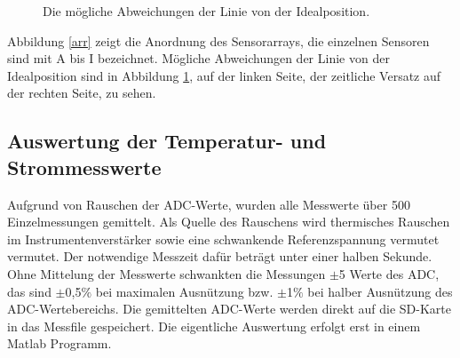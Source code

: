 \documentclass[a4paper,bibtotoc,oneside]{scrbook}
\begin{document}
\begin{figure}
\centering
\caption{Die mögliche Abweichungen der Linie von der Idealposition.}
\label{abw}
\end{figure} 

\noindent Abbildung \ref{arr} zeigt die Anordnung des Sensorarrays, die einzelnen Sensoren sind mit A bis I bezeichnet. Mögliche Abweichungen der Linie von der Idealposition sind in Abbildung \ref{abw}, auf der linken Seite, der zeitliche Versatz auf der rechten Seite, zu sehen.

\subsection{Auswertung der Temperatur- und Strommesswerte}\thispagestyle{empty}
Aufgrund von Rauschen der ADC-Werte, wurden alle Messwerte über 500 Einzelmessungen gemittelt. Als Quelle des Rauschens wird thermisches Rauschen im Instrumentenverstärker sowie eine schwankende Referenzspannung vermutet vermutet. Der notwendige Messzeit dafür beträgt unter einer halben Sekunde. Ohne Mittelung der Messwerte schwankten die Messungen $\pm$5 Werte des ADC, das sind $\pm$0,5$\%$ bei maximalen Ausnützung bzw. $\pm$1$\%$ bei halber Ausnützung des ADC-Wertebereichs. Die gemittelten ADC-Werte werden direkt auf die SD-Karte in das Messfile gespeichert. Die eigentliche Auswertung erfolgt erst in einem Matlab Programm.
 
\end{document}
